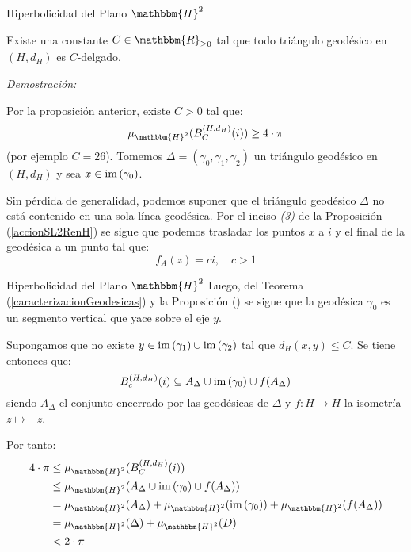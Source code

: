 \documentclass[xcolor=dvipsnames]{beamer}
\theoremstyle{largebreak}
\newcommand\cf[3]{\ensuremath{#1:#2\rightarrow#3}}
\newcommand{\bbm}[1]{\ensuremath{\mathbbm{#1}}}
\newcommand{\im}[1]{\ensuremath{\textup{im}\left(#1\right)}}
\begin{document}
\begin{frame}{Hiperbolicidad del Plano $\bbm{H}^2$}
    \begin{theor}
        Existe una constante $C\in\bbm{R}_{\geq0}$ tal que todo triángulo geodésico en $(H,d_H)$ es $C$-delgado.
    \end{theor}

    \textit{Demostración:}

    Por la proposición anterior, existe $C>0$ tal que:
    \begin{equation*}
        \mu_{\bbm{H}^2}(B_C^{(H,d_H)}(i))\geq 4\cdot\pi
    \end{equation*}
    (por ejemplo $C=26$). Tomemos $\Delta=(\gamma_0,\gamma_1,\gamma_2)$ un triángulo geodésico en $(H,d_H)$ y sea $x\in\im{\gamma_0}$.

    Sin pérdida de generalidad, podemos suponer que el triángulo geodésico $\Delta$ no está contenido en una sola línea geodésica. Por el inciso \textit{(3)} de la Proposición (\ref{accionSL2RenH}) se sigue que podemos trasladar los puntos $x$ a $i$ y el final de la geodésica a un punto tal que:
    \begin{equation*}
        f_A(z)=ci, \quad c>1
    \end{equation*}

\end{frame}

\begin{frame}{Hiperbolicidad del Plano $\bbm{H}^2$}
    Luego, del Teorema (\ref{caracterizacionGeodesicas}) y la Proposición () se sigue que la geodésica $\gamma_0$ es un segmento vertical que yace sobre el eje $y$.

    Supongamos que no existe $y\in\im{\gamma_1}\cup\im{\gamma_2}$ tal que $d_H(x,y)\leq C$. Se tiene entonces que:
    \begin{equation*}
        B_c^{(H,d_H)}(i)\subseteq A_\Delta\cup\im{\gamma_0}\cup f(A_\Delta)
    \end{equation*}
    siendo $A_\Delta$ el conjunto encerrado por las geodésicas de $\Delta$ y $\cf{f}{H}{H}$ la isometría $z\mapsto-\overline{z}$.


    Por tanto:
    \begin{equation*}
        \begin{split}
            4\cdot\pi&\leq\mu_{\bbm{H}^2}(B_C^{(H,d_H)}(i))\\
            &\leq\mu_{\bbm{H}^2}(A_\Delta\cup\im{\gamma_0}\cup f(A_\Delta))\\
            &=\mu_{\bbm{H}^2}(A_\Delta)+\mu_{\bbm{H}^2}(\im{\gamma_0})+\mu_{\bbm{H}^2}(f(A_\Delta))\\
            &=\mu_{\bbm{H}^2}(\Delta)+\mu_{\bbm{H}^2}(D)\\
            &< 2\cdot\pi\\
        \end{split}
    \end{equation*}
\end{frame}
\end{document}
